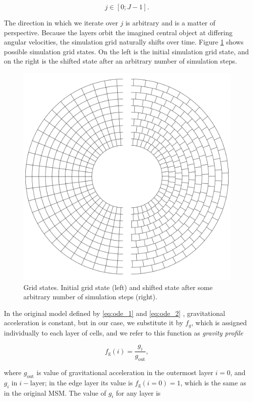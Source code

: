 \begin{equation}
j \in [0;J-1].
\end{equation}

The direction in which we iterate over $j$ is arbitrary and is a matter of perspective. Because the layers orbit the imagined central object at differing angular velocities, the simulation grid naturally shifts over time. Figure \ref{fig:grid_states} shows possible simulation grid states. On the left is the initial simulation grid state, and on the right is the shifted state after an arbitrary number of simulation steps.

\begin{figure}[H]
\centering
\includegraphics[width=0.6\columnwidth]{img/grid_states.pdf}
\caption{Grid states. Initial grid state (left) and shifted state after some arbitrary number of simulation steps (right).}
\label{fig:grid_states}
\end{figure}

In the original model defined by \ref{eq:ode_1} and \ref{eq:ode_2} \cite{msmm1999}, gravitational acceleration is constant, but in our case, we substitute it by $f_g$, which is assigned individually to each layer of cells, and we refer to this function as \emph{gravity profile}

\begin{equation}
    f_{\text{g}}(i) = \frac{g_i}{g_{\text{out}}},
    \label{eq:gravity_profile_0}
\end{equation}

where $g_{\text{out}}$ is value of gravitational acceleration in the outermost layer $i=0$, and $g_i$ in ${i-\mathrm{layer}}$; in the edge layer its value is ${f_{\text{g}}(i=0) = 1}$, which is the same as in the original MSM. The value of $g_i$ for any layer is 

